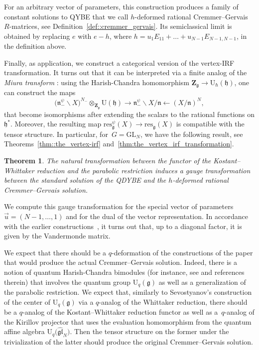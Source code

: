 \documentclass[pdftex]{sigma}
\numberwithin{equation}{section}
\newtheorem{thmx}{Theorem}
\newcommand{\U}{\mathrm{U}_{\hbar}}
\newcommand{\Z}{\mathbf{Z}}
\newcommand{\GL}{\mathrm{GL}}
\newcommand{\g}{\mathfrak{g}}
\newcommand{\h}{\mathfrak{h}}
\newcommand{\n}{\mathfrak{n}}
\newcommand{\res}{\mathrm{res}}
\newcommand{\gl}{\mathfrak{gl}}
\begin{document}
	For an arbitrary vector of parameters, this construction produces a family of constant solutions to QYBE that we call $h$-deformed rational Cremmer--Gervais $R$-matrices, see Definition~\ref{def::cremmer_gervais}. Its semiclassical limit is obtained by replacing $e$ with $e-h$, where $h = u_1 E_{11} + \dots + u_{N-1} E_{N-1,N-1}$, in the definition above.
	
	Finally, as application, we construct a categorical version of the vertex-IRF transformation. It turns out that it can be interpreted via a finite analog of the \emph{Miura transform} \cite{GinzburgKazhdan}: using the Harish-Chandra homomorphism $\Z_{\g} \rightarrow \U(\h)$, one can construct the maps
	\[
	\bigl(\n_-^{\psi} \backslash X\bigr)^{N_-} \otimes_{\Z_{\g}} \mathrm{U}(\h) \rightarrow \n_-^{\psi} \backslash X /\n \leftarrow (X/\n)^{N},
	\]
	that become isomorphisms after extending the scalars to the rational functions on $\h^*$. Moreover, the resulting map $\res^{\psi}_{\g} (X) \rightarrow \res_{\g}(X)$ is compatible with the tensor structure. In particular, for~${G = \GL_N}$, we have the following result, see Theorems~\ref{thm::the_vertex-irf} and~\ref{thm:the_vertex_irf_transformation}.
	
	\begin{thmx}
		The natural transformation between the functor of the Kostant--Whittaker reduction and the parabolic restriction induces a gauge transformation between the standard solution of the QDYBE and the $h$-deformed rational Cremmer--Gervais solution.
	\end{thmx}
	
	We compute this gauge transformation for the special vector of parameters $\vec{u} = (N-1,\dots,1)$ and for the dual of the vector representation. In accordance with the
	earlier constructions~\cite{BalogDabrowskiFeher,BuffenoirRocheTerras,CremmerGervais}, it turns out that, up to a diagonal factor, it is given by the Vandermonde matrix.
	
	We expect that there should be a $q$-deformation of the constructions of the paper that would produce the actual Cremmer--Gervais solution. Indeed, there is a notion of quantum Harish-Chandra bimodules (for instance, see \cite[Section 2.5]{KalmykovSafronov} and references therein) that involves the quantum group $\mathrm{U}_q(\g)$ as well as a generalization of the parabolic restriction. We expect that, similarly to Sevostyanov's construction \cite{SevostyanovWhittakerModules} of the center of $\mathrm{U}_q(\g)$ via a $q$-analog of the Whittaker reduction, there should be a $q$-analog of the Kostant--Whittaker reduction functor as well as a~$q$-analog of the Kirillov projector that uses the evaluation homomorphism from the quantum affine algebra $\mathrm{U}_q\bigl(\hat{\gl}_N\bigr)$. Then the tensor structure on the former under the trivialization of the latter should produce the original Cremmer--Gervais solution.
	
\end{document}
